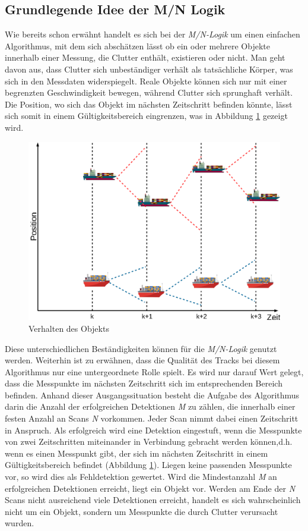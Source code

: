 \documentclass[10pt,a4paper]{article}
\begin{document}
\subsection{Grundlegende Idee der M/N Logik}
	Wie bereits schon erwähnt handelt es sich bei der \textit{M/N-Logik} um einen einfachen Algorithmus, mit dem sich abschätzen lässt ob ein oder mehrere Objekte innerhalb einer Messung, die Clutter enthält, existieren oder nicht. Man geht davon aus, dass Clutter sich unbeständiger verhält als tatsächliche Körper, was sich in den Messdaten widerspiegelt. Reale Objekte können sich nur mit einer begrenzten Geschwindigkeit bewegen, während Clutter sich sprunghaft verhält. Die Position, wo sich das Objekt im nächsten Zeitschritt befinden könnte, lässt sich somit in einem Gültigkeitsbereich eingrenzen, was in Abbildung \ref{fig: Verhalten des Objekts} gezeigt wird.
	\begin{figure}[h]
		\centering
		\includegraphics[width=0.7\linewidth]{./Pictures_report/Verhalten des Objekts.png}
		\caption{Verhalten des Objekts}
		\label{fig: Verhalten des Objekts}
	\end{figure}
	Diese unterschiedlichen Beständigkeiten können für die \textit{M/N-Logik} genutzt werden. Weiterhin ist zu erwähnen, dass die Qualität des Tracks bei diesem Algorithmus nur eine untergeordnete Rolle spielt. Es wird nur darauf Wert gelegt, dass die Messpunkte im nächsten Zeitschritt sich im entsprechenden Bereich befinden. 
	\newline
	Anhand dieser Ausgangssituation besteht die Aufgabe des Algorithmus darin die Anzahl der erfolgreichen Detektionen \textit{M} zu zählen, die innerhalb einer festen Anzahl an Scans \textit{N} vorkommen. Jeder Scan nimmt dabei einen Zeitschritt in Anspruch. Als erfolgreich wird eine Detektion eingestuft, wenn die Messpunkte von zwei Zeitschritten miteinander in Verbindung gebracht werden können,d.h. wenn es einen Messpunkt gibt, der sich im nächsten Zeitschritt in einem Gültigkeitsbereich befindet (Abbildung \ref{fig: Verhalten des Objekts}). Liegen keine passenden Messpunkte vor, so wird dies als Fehldetektion gewertet. Wird die Mindestanzahl \textit{M} an erfolgreichen Detektionen erreicht, liegt ein Objekt vor. Werden am Ende der \textit{N} Scans nicht ausreichend viele Detektionen erreicht, handelt es sich  wahrscheinlich nicht um ein Objekt, sondern um Messpunkte die durch Clutter verursacht wurden.
\end{document}
